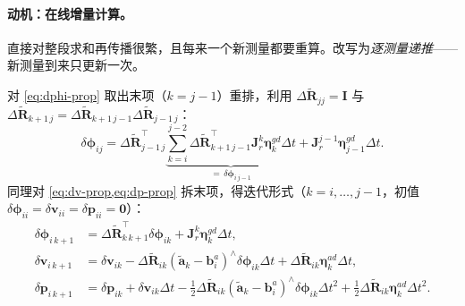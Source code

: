\paragraph{动机：在线增量计算。}
直接对整段求和再传播很繁，且每来一个新测量都要重算。改写为\emph{逐测量递推}——新测量到来只更新一次\cite{forster2017preintegration}。

\begin{derivation}[从求和到递推]
对 \cref{eq:dphi-prop} 取出末项（$k=j-1$）重排，利用 $\Delta\tilde{\mathbf R}_{jj}=\mathbf I$ 与 $\Delta\tilde{\mathbf R}_{k+1\,j}=\Delta\tilde{\mathbf R}_{k+1\,j-1}\Delta\tilde{\mathbf R}_{j-1\,j}$：
\[
  \delta\boldsymbol\phi_{ij}=\Delta\tilde{\mathbf R}_{j-1\,j}^\top\underbrace{\sum_{k=i}^{j-2}\Delta\tilde{\mathbf R}_{k+1\,j-1}^\top\mathbf J_r^k\boldsymbol\eta_k^{gd}\Delta t}_{=\,\delta\boldsymbol\phi_{i\,j-1}}+\mathbf J_r^{j-1}\boldsymbol\eta_{j-1}^{gd}\Delta t.
\]
同理对 \cref{eq:dv-prop,eq:dp-prop} 拆末项，得迭代形式（$k=i,\dots,j-1$，初值 $\delta\boldsymbol\phi_{ii}=\delta\mathbf v_{ii}=\delta\mathbf p_{ii}=\mathbf 0$）：
\begin{align*}
  \delta\boldsymbol\phi_{i\,k+1}&=\Delta\tilde{\mathbf R}_{k\,k+1}^\top\delta\boldsymbol\phi_{ik}+\mathbf J_r^k\boldsymbol\eta_k^{gd}\Delta t,\\
  \delta\mathbf v_{i\,k+1}&=\delta\mathbf v_{ik}-\Delta\tilde{\mathbf R}_{ik}(\tilde{\mathbf a}_k-\mathbf b_i^a)^\wedge\delta\boldsymbol\phi_{ik}\Delta t+\Delta\tilde{\mathbf R}_{ik}\boldsymbol\eta_k^{ad}\Delta t,\\
  \delta\mathbf p_{i\,k+1}&=\delta\mathbf p_{ik}+\delta\mathbf v_{ik}\Delta t-\tfrac12\Delta\tilde{\mathbf R}_{ik}(\tilde{\mathbf a}_k-\mathbf b_i^a)^\wedge\delta\boldsymbol\phi_{ik}\Delta t^2+\tfrac12\Delta\tilde{\mathbf R}_{ik}\boldsymbol\eta_k^{ad}\Delta t^2.
\end{align*}
\end{derivation}

